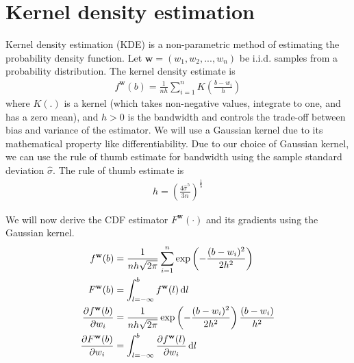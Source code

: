 \section{Kernel density estimation}
Kernel density estimation (KDE) is a non-parametric method of estimating the probability density function. Let $ \mathbf{w} = \left( w_1, w_2, ..., w_n\right)$ be i.i.d. samples from a probability distribution. The kernel density estimate is
\begin{align}
    f^\mathbf{w} (b) = \frac{1}{nh} \sum_{i=1}^{n} K\left(\frac{b-w_i}{h}\right) \label{eqn:kde}
\end{align}
where $K(.)$ is a kernel (which takes non-negative values, integrate to one, and has a zero mean), and $h > 0$ is the bandwidth and controls the trade-off between bias and variance of the estimator. We will use a Gaussian kernel due to its mathematical property like differentiability. Due to our choice of Gaussian kernel, we can use the rule of thumb estimate \cite{silverman1986density} for bandwidth using the sample standard deviation $\hat{\sigma}$. The rule of thumb estimate is
\begin{align}
    h = \left( \frac{4 \hat{\sigma}^5}{3n}\right)^{\frac{1}{5}} \label{eqn:kdebw}
\end{align}

We will now derive the CDF estimator $F^\mathbf{w} \left( \cdot \right)$ and its gradients using the Gaussian kernel.
\begin{align}
    f^\mathbf{w} (b) &= \frac{1}{nh \sqrt{2 \pi}} \sum_{i=1}^{n} \exp \left( -\frac{(b-w_i)^2} {2 h^2}\right) \\
    F^\mathbf{w} (b) &= \int_{l=-\infty}^{b} f^\mathbf{w} (l) \mathop{}\!\mathrm{d} l \label{eqn:kdecdf} \\
    \frac{\partial f^\mathbf{w} (b)}{\partial w_i} &=  \frac{1}{nh \sqrt{2 \pi}} \exp \left( -\frac{(b-w_i)^2} {2 h^2}\right) \frac{ \left( b - w_i \right) }{h^2} \\
    \frac{\partial F^\mathbf{w} (b)} {\partial w_i} &= \int
    _{l=-\infty}^{b} \frac{\partial f^\mathbf{w} (l)}{\partial w_i} \mathop{}\!\mathrm{d} l
\end{align}

